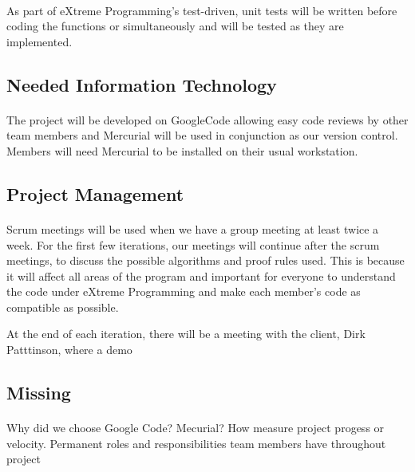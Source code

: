 \paragraph{}
As part of eXtreme Programming's test-driven, unit tests will be written before coding the functions or simultaneously and will be tested as they are implemented.

\subsection{Needed Information Technology}

\paragraph{}
The project will be developed on GoogleCode allowing easy code reviews by other team members and Mercurial will be used in conjunction as our version control.
Members will need Mercurial to be installed on their usual workstation.

\subsection{Project Management}

\paragraph{}
Scrum meetings will be used when we have a group meeting at least twice a week. For the first few iterations, our meetings will continue after the scrum meetings, to discuss the possible algorithms and proof rules used. This is because it will affect all areas of the program and important for everyone to understand the code under eXtreme Programming and make each member's code as compatible as possible.

At the end of each iteration, there will be a meeting with the client, Dirk Patttinson, where a demo 

\subsection{Missing}

\paragraph{}
Why did we choose Google Code? Mecurial? How measure project progess or velocity. Permanent roles and responsibilities team members have throughout project